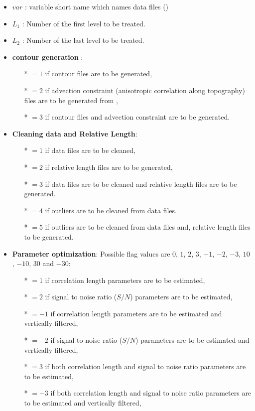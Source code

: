 \begin{itemize}
\item $var$ :  variable short name which names data files ()
\item $L_1$ :  Number of the first level to be treated. 
\item $L_2$ :  Number of the last level to be treated.
\item {\bf contour generation} : 
              \begin{itemize}
                \item[*] $=1$ if contour files are to be generated,
                \item[*] $=2$ if advection constraint (anisotropic correlation along topography) files are to be generated from ,
                \item[*] $=3$ if contour files and advection constraint are to be generated.
              \end{itemize}
\item {\bf Cleaning data and Relative Length}: 
              \begin{itemize}
                \item[*] $=1$ if data files are to be cleaned,
                \item[*] $=2$ if relative length files are to be generated,
                \item[*] $=3$ if data files are to be cleaned and relative length files are to be generated.
                \item[*] $=4$ if outliers are to be cleaned from data files.
                \item[*] $=5$ if outliers are to be cleaned from data files and, relative length files to be generated.
              \end{itemize}


\item {\bf Parameter optimization}: Possible flag values are $0$, $1$, $2$, $3$, $-1$, $-2$, $-3$, $10$, $-10$, $30$ and $-30$:
              \begin{itemize}
                \item[*] $=1$ if correlation length parameters are to be estimated,
                \item[*] $=2$ if signal to noise ratio ($S/N$) parameters are to be estimated,
                \item[*] $=-1$ if correlation length parameters are to be estimated and vertically filtered,
                \item[*] $=-2$ if signal to noise ratio ($S/N$) parameters are to be estimated and vertically filtered,
                \item[*] $=3$ if both  correlation length and  signal to noise ratio parameters are to be estimated,
                \item[*] $=-3$ if both  correlation length and  signal to noise ratio parameters are to be estimated and vertically filtered,


\end{itemize}
\end{itemize}

